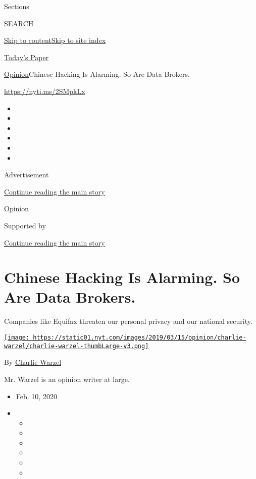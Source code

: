 Sections

SEARCH

\protect\hyperlink{site-content}{Skip to
content}\protect\hyperlink{site-index}{Skip to site index}

\href{https://myaccount.nytimes.com/auth/login?response_type=cookie\&client_id=vi}{}

\href{https://www.nytimes.com/section/todayspaper}{Today's Paper}

\href{/section/opinion}{Opinion}\textbar{}Chinese Hacking Is Alarming.
So Are Data Brokers.

\url{https://nyti.ms/2SMpkLx}

\begin{itemize}
\item
\item
\item
\item
\item
\item
\end{itemize}

Advertisement

\protect\hyperlink{after-top}{Continue reading the main story}

\href{/section/opinion}{Opinion}

Supported by

\protect\hyperlink{after-sponsor}{Continue reading the main story}

\hypertarget{chinese-hacking-is-alarming-so-are-data-brokers}{%
\section{Chinese Hacking Is Alarming. So Are Data
Brokers.}\label{chinese-hacking-is-alarming-so-are-data-brokers}}

Companies like Equifax threaten our personal privacy and our national
security.

\href{https://www.nytimes.com/by/charlie-warzel}{\texttt{[image: https://static01.nyt.com/images/2019/03/15/opinion/charlie-warzel/charlie-warzel-thumbLarge-v3.png]}}

By \href{https://www.nytimes.com/by/charlie-warzel}{Charlie Warzel}

Mr. Warzel is an opinion writer at large.

\begin{itemize}
\item
  Feb. 10, 2020
\item
  \begin{itemize}
  \item
  \item
  \item
  \item
  \item
  \item
  \end{itemize}
\end{itemize}

